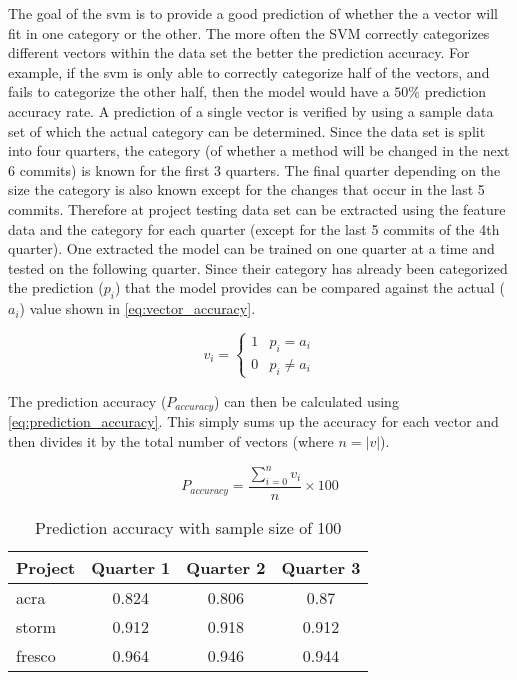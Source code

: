 The goal of the \gls{svm} is to provide a good prediction of whether the a vector will fit in one category or the other. The more often the SVM correctly categorizes different vectors within the data set the better the prediction accuracy. For example, if the \gls{svm} is only able to correctly categorize half of the vectors, and fails to categorize the other half, then the model would have a $50\%$ prediction accuracy rate. A prediction of a single vector is verified by using a sample data set of which the actual category can be determined. Since the data set is split into four quarters, the category (of whether a method will be changed in the next 6 commits) is known for the first 3 quarters. The final quarter depending on the size the category is also known except for the changes that occur in the last 5 commits. Therefore at project testing data set can be extracted using the feature data and the category for each quarter (except for the last 5 commits of the 4th quarter). One extracted the model can be trained on one quarter at a time and tested on the following quarter. Since their category has already been categorized the prediction ($p_i$) that the model provides can be compared against the actual ($a_i$) value shown in \ref{eq:vector_accuracy}.


\begin{equation} 
\label{eq:vector_accuracy}
v_i = \left\{\begin{matrix}
1 & p_i = a_i\\ 
0 & p_i \ne a_i
\end{matrix}\right.
\end{equation}

The prediction accuracy ($P_{accuracy}$) can then be calculated using \ref{eq:prediction_accuracy}. This simply sums up the accuracy for each vector and then divides it by the total number of vectors (where $n = |v|$).

\begin{equation}
\label{eq:prediction_accuracy}
P_{accuracy} = \frac{\sum_{i=0}^{n}v_i}{n} \times 100
\end{equation}

\begin{table}
\begin{center}

    \begin{tabular}{|l|c|c|c|}
        \hline
        Project & Quarter 1 & Quarter 2 & Quarter 3 \\ \hline
        acra & 0.824 & 0.806 & 0.87   \\ \hline
        storm & 0.912 & 0.918 & 0.912 \\ \hline
        fresco & 0.964 & 0.946 & 0.944 \\ \hline
    \end{tabular}
    \caption{Prediction accuracy with sample size of 100}
    \label{tab:test_signature_change_freq_100}
\end{center}

\end{table}


